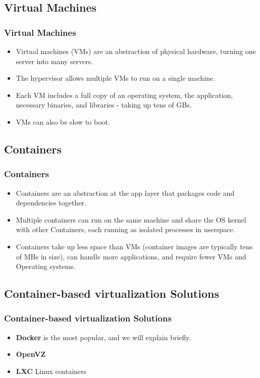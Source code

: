 \subsection{Virtual Machines}
\begin{frame}
	\frametitle{Virtual Machines}
	\begin{itemize}
		\item Virtual machines (VMs) are an abstraction of physical hardware, turning one server into many servers.
		\item The hypervisor allows multiple VMs to run on a single machine.
		\item Each VM includes a full copy of an operating system, the application, necessary binaries, and libraries - taking up tens of GBs.
		\item VMs can also be slow to boot.
	\end{itemize}
\end{frame}

\subsection{Containers}
\begin{frame}
	\frametitle{Containers}
	\begin{itemize}
		\item Containers are an abstraction at the app layer that packages code and dependencies together.
		\item Multiple containers can run on the same machine and share the OS kernel with other Containers, each running as isolated processes in userspace.
		\item Containers take up less space than VMs (container images are typically tens of MBs in size), can handle more applications, and require fewer VMs and Operating systems. 
	\end{itemize}
\end{frame}

\subsection{Container-based virtualization Solutions}
\begin{frame}
	\frametitle{Container-based virtualization Solutions}
	\begin{itemize}
		\item \textbf{Docker} is the most popular, and we will explain briefly.
		\item \textbf{OpenVZ}
		\item \textbf{LXC} Linux containers 
	\end{itemize}
\end{frame}


